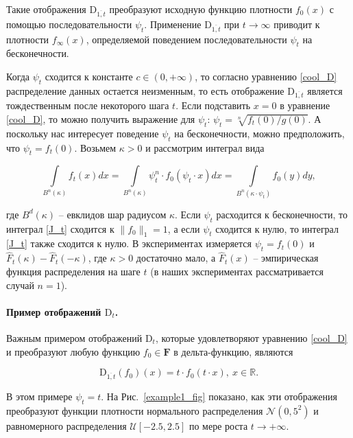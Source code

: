         Такие отображения $\text{D}_{\overline{1, t}}$ преобразуют исходную функцию плотности $f_0(x)$ с помощью последовательности $\psi_t$. Применение $\text{D}_{\overline{1, t}}$ при $t \to \infty$ приводит к плотности $f_\infty(x)$, определяемой поведением последовательности $\psi_t$ на бесконечности.
    
        Когда $\psi_t$ сходится к константе $c \in (0, +\infty)$, то согласно уравнению \eqref{cool_D} распределение данных остается неизменным, то есть отображение $\text{D}_{\overline{1, t}}$ является тождественным после некоторого шага $t$.
        Если подставить $x = 0$ в уравнение \eqref{cool_D}, то можно получить выражение для $\psi_t$: $\psi_t = \sqrt[n]{f_t(0) / g(0)}$. А поскольку нас интересует поведение $\psi_t$ на бесконечности, можно предположить, что $\psi_t = f_t(0)$.  Возьмем $\kappa > 0$ и рассмотрим интеграл вида 
    
        \begin{equation} \label{J_t}
            \int\limits_{B^n(\kappa)}f_t(x)dx = \int\limits_{B^n(\kappa)}\psi_t^n \cdot f_0(\psi_t \cdot x)dx = \int\limits_{B^n(\kappa \cdot \psi_t)} f_0(y)dy,
        \end{equation}
    
        где $B^d(\kappa)$ -- евклидов шар радиусом $\kappa$. Если $\psi_t$ расходится к бесконечности, то интеграл \eqref{J_t} сходится к $\|f_0\|_1 = 1$, а если $\psi_t$ сходится к нулю, то интеграл \eqref{J_t} также сходится к нулю. В экспериментах измеряется $\psi_t = f_t(0)$ и $\hat{F}_t(\kappa) - \hat{F}_t(-\kappa)$, где $\kappa > 0$ достаточно мало, а $\hat{F}_t(x)$ -- эмпирическая функция распределения на шаге $t$ (в наших экспериментах рассматривается случай $n=1$). 
    
        \paragraph{Пример отображений $\text{D}_t$.} Важным примером отображений $\text{D}_t$, которые удовлетворяют уравнению \eqref{cool_D} и преобразуют любую функцию $f_0 \in \textbf{F}$ в дельта-функцию, являются
    
        \begin{equation*}
            \text{D}_{\overline{1, t}}(f_0)(x) = t \cdot f_0(t \cdot x), ~x \in \mathbb{R}.
        \end{equation*}
        
        В этом примере $\psi_t = t$. На Рис.~\ref{example1_fig} показано, как эти отображения преобразуют функции плотности нормального распределения $\mathcal{N}(0, 5^2)$ и равномерного распределения $\mathcal{U}[-2.5, 2.5]$ по мере роста $t \to +\infty$.
    
